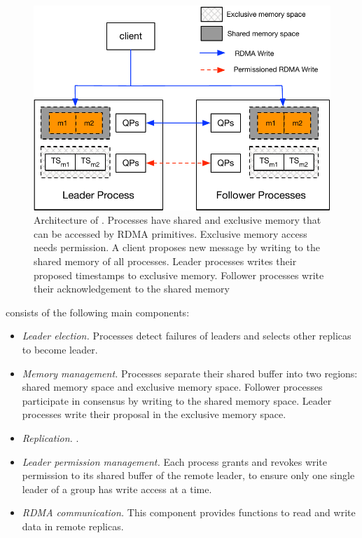 \begin{figure}[ht!]
  \centering
  \includegraphics[width=1\linewidth]{figures/architecture}
  \caption{Architecture of \libname. Processes have shared and exclusive memory that can be accessed by RDMA primitives. Exclusive memory access needs permission. A client proposes new message by writing to the shared memory of all processes. Leader processes writes their proposed timestamps to exclusive memory. Follower processes write their acknowledgement to the shared memory}
  \label{fig:normal_operation_time}
\end{figure}


\libname consists of the following main components:
\begin{itemize}
  \item \emph{Leader election.} Processes detect failures of leaders and
  selects other replicas to become leader.
  \item \emph{Memory management.} Processes separate their shared buffer into two
  regions: shared memory space and exclusive memory space. Follower processes
  participate in consensus by writing to the shared memory space. Leader
  processes write their proposal in the exclusive memory space.
  \item \emph{Replication.} .
  \item \emph{Leader permission management.} Each process grants and revokes
  write permission to its shared buffer of the remote leader, to ensure only one
  single leader of a group has write access at a time.
  \item \emph{RDMA communication.} This component provides functions to read and
  write data in remote replicas.
\end{itemize}

